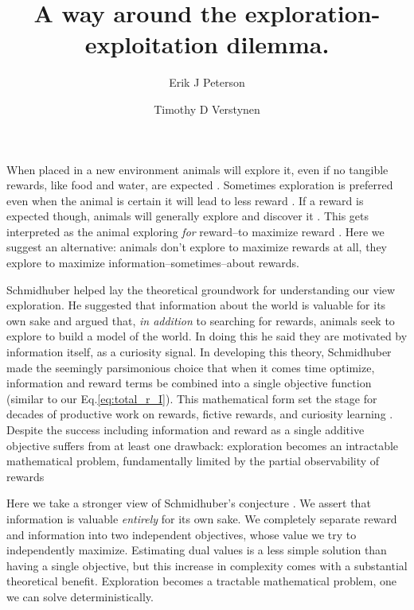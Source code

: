 \documentclass[9pt,twocolumn,twoside]{pnas-new}
\title{A way around the exploration-exploitation dilemma.}
\author[a,1]{Erik J Peterson}
\author[a,b]{Timothy D Verstynen}
\affil[a]{Department of Psychology}
\affil[b]{Center for the Neural Basis of Cognition, Carnegie Mellon University, Pittsburgh PA}
\begin{document}
\verticaladjustment{-2pt}
\maketitle


\thispagestyle{firststyle}
When placed in a new environment animals will explore it, even if no tangible rewards, like food and water, are expected \cite{Liu2019,Jaegle,Todd2015}. Sometimes exploration is preferred even when the animal is certain it will lead to less reward \cite{ZheWang2019}. If a reward is expected though, animals will generally explore and discover it \cite{Todd2015}. This gets interpreted as the animal exploring \textit{for} reward--to maximize reward \cite{Sutton2018}. Here we suggest an alternative: animals don't explore to maximize rewards at all, they explore to maximize information--sometimes--about rewards. 

Schmidhuber helped lay the theoretical groundwork for understanding our view exploration. He suggested that information about the world is valuable for its own sake \cite{Schmidhuber1991} and argued that, \textit{in addition} to searching for rewards, animals seek to explore to build a model of the world. In doing this he said they are motivated by information itself, as a curiosity signal. In developing this theory, Schmidhuber made the seemingly parsimonious choice that when it comes time optimize, information and reward terms be combined into a single objective function (similar to our Eq.\ref{eq:total_r_I}). This mathematical form set the stage for decades of productive work on rewards, fictive rewards, and curiosity learning \cite{Pathak2017,Sutton1990,dayan1996exploration}. Despite the success including information and reward as a single additive objective suffers from at least one drawback: exploration becomes an intractable mathematical problem, fundamentally limited by the partial observability of rewards \cite{thrun1992active,dayan1996exploration,findling2018computational,gershman2018deconstructing} 

Here we take a stronger view of Schmidhuber's conjecture \cite{Schmidhuber1991}. We assert that information is valuable \textit{entirely} for its own sake. We completely separate reward and information into two independent objectives, whose value we try to independently maximize. Estimating dual values is a less simple solution than having a single objective, but this increase in complexity comes with a substantial theoretical benefit. Exploration becomes a tractable mathematical problem, one we can solve deterministically.
\end{document}
